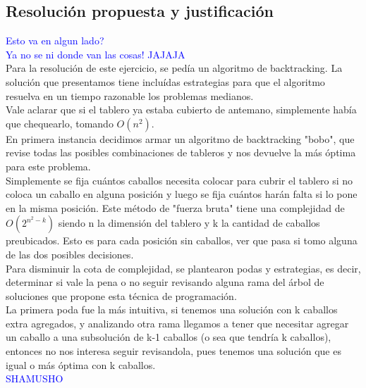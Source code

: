 \newpage
\subsection{Resoluci\'on propuesta y justificaci\'on}
\textcolor{blue}{Esto va en algun lado?}\\
\textcolor{blue}{Ya no se ni donde van las cosas! JAJAJA}\\

Para la resoluci\'on de este ejercicio, se ped\'ia un algoritmo de backtracking. La soluci\'on que presentamos tiene inclu\'idas estrategias para que el algoritmo resuelva en un tiempo razonable los problemas medianos.\\

Vale aclarar que si el tablero ya estaba cubierto de antemano, simplemente hab\'ia que chequearlo, tomando $O(n^{2})$.\\

En primera instancia decidimos armar un algoritmo de backtracking "bobo", que revise todas las posibles combinaciones de tableros y nos devuelve la m\'as \'optima para este problema.\\

Simplemente se fija cu\'antos caballos necesita colocar para cubrir el tablero si no coloca un caballo en alguna posici\'on y luego se fija cu\'antos har\'an falta si lo pone en la misma posici\'on. Este m\'etodo de "fuerza bruta" tiene una complejidad de $O(2^{n^{2} - k})$ siendo n la dimensi\'on del tablero y k la cantidad de caballos preubicados. Esto es para cada posici\'on sin caballos, ver que pasa si tomo alguna de las dos posibles decisiones.\\

Para disminuir la cota de complejidad, se plantearon podas y estrategias, es decir, determinar si vale la pena o no seguir revisando alguna rama del \'arbol de soluciones que propone esta t\'ecnica de programaci\'on.\\

La primera poda fue la m\'as intuitiva, si tenemos una soluci\'on con k caballos extra agregados,  y analizando otra rama llegamos a tener que necesitar agregar un caballo a una subsoluci\'on de k-1 caballos (o sea que tendr\'ia k caballos), entonces no nos interesa seguir revisandola, pues tenemos una soluci\'on que es igual o m\'as \'optima con k caballos.\\

\textcolor{blue}{SHAMUSHO}\\

